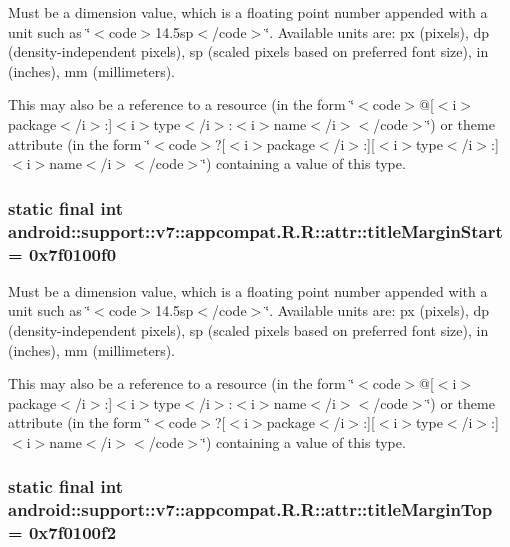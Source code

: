 Must be a dimension value, which is a floating point number appended with a unit such as \char`\"{}$<$code$>$14.5sp$<$/code$>$\char`\"{}. Available units are: px (pixels), dp (density-independent pixels), sp (scaled pixels based on preferred font size), in (inches), mm (millimeters). 

This may also be a reference to a resource (in the form \char`\"{}$<$code$>$@\mbox{[}$<$i$>$package$<$/i$>$:\mbox{]}$<$i$>$type$<$/i$>$:$<$i$>$name$<$/i$>$$<$/code$>$\char`\"{}) or theme attribute (in the form \char`\"{}$<$code$>$?\mbox{[}$<$i$>$package$<$/i$>$:\mbox{]}\mbox{[}$<$i$>$type$<$/i$>$:\mbox{]}$<$i$>$name$<$/i$>$$<$/code$>$\char`\"{}) containing a value of this type. \hypertarget{classandroid_1_1support_1_1v7_1_1appcompat_1_1_r_1_1attr_8a25f4fb1e1c4eba38d0d495bd79b72f}{
\subsubsection[{titleMarginStart}]{\setlength{\rightskip}{0pt plus 5cm}static final int android::support::v7::appcompat.R.R::attr::titleMarginStart = 0x7f0100f0}}
\label{classandroid_1_1support_1_1v7_1_1appcompat_1_1_r_1_1attr_8a25f4fb1e1c4eba38d0d495bd79b72f}


Must be a dimension value, which is a floating point number appended with a unit such as \char`\"{}$<$code$>$14.5sp$<$/code$>$\char`\"{}. Available units are: px (pixels), dp (density-independent pixels), sp (scaled pixels based on preferred font size), in (inches), mm (millimeters). 

This may also be a reference to a resource (in the form \char`\"{}$<$code$>$@\mbox{[}$<$i$>$package$<$/i$>$:\mbox{]}$<$i$>$type$<$/i$>$:$<$i$>$name$<$/i$>$$<$/code$>$\char`\"{}) or theme attribute (in the form \char`\"{}$<$code$>$?\mbox{[}$<$i$>$package$<$/i$>$:\mbox{]}\mbox{[}$<$i$>$type$<$/i$>$:\mbox{]}$<$i$>$name$<$/i$>$$<$/code$>$\char`\"{}) containing a value of this type. \hypertarget{classandroid_1_1support_1_1v7_1_1appcompat_1_1_r_1_1attr_a1417805ecd96a1a835b5048e526ae7d}{
\subsubsection[{titleMarginTop}]{\setlength{\rightskip}{0pt plus 5cm}static final int android::support::v7::appcompat.R.R::attr::titleMarginTop = 0x7f0100f2}}
\label{classandroid_1_1support_1_1v7_1_1appcompat_1_1_r_1_1attr_a1417805ecd96a1a835b5048e526ae7d}


